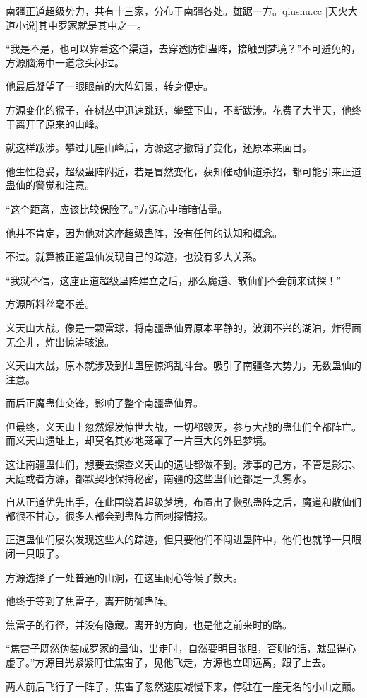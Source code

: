 \begin{this_body}
南疆正道超级势力，共有十三家，分布于南疆各处。雄踞一方。qiushu.cc [天火大道小说]其中罗家就是其中之一。

“我是不是，也可以靠着这个渠道，去穿透防御蛊阵，接触到梦境？”不可避免的，方源脑海中一道念头闪过。

他最后凝望了一眼眼前的大阵幻景，转身便走。

方源变化的猴子，在树丛中迅速跳跃，攀壁下山，不断跋涉。花费了大半天，他终于离开了原来的山峰。

就这样跋涉。攀过几座山峰后，方源这才撤销了变化，还原本来面目。

他生性稳妥，超级蛊阵附近，若是冒然变化，获知催动仙道杀招，都可能引来正道蛊仙的警觉和注意。

“这个距离，应该比较保险了。”方源心中暗暗估量。

他并不肯定，因为他对这座超级蛊阵，没有任何的认知和概念。

不过。就算被正道蛊仙发现自己的踪迹，也没有多大关系。

“我就不信，这座正道超级蛊阵建立之后，那么魔道、散仙们不会前来试探！”

方源所料丝毫不差。

义天山大战。像是一颗雷球，将南疆蛊仙界原本平静的，波澜不兴的湖泊，炸得面无全非，炸出惊涛骇浪。

义天山大战，原本就涉及到仙蛊屋惊鸿乱斗台。吸引了南疆各大势力，无数蛊仙的注意。

而后正魔蛊仙交锋，影响了整个南疆蛊仙界。

但最终，义天山上忽然爆发惊世大战，一切都毁灭，参与大战的蛊仙们全都阵亡。而义天山遗址上，却莫名其妙地笼罩了一片巨大的外显梦境。

这让南疆蛊仙们，想要去探查义天山的遗址都做不到。涉事的己方，不管是影宗、天庭或者方源，都默契地保持秘密，南疆的这些蛊仙还都是一头雾水。

自从正道优先出手，在此围绕着超级梦境，布置出了恢弘蛊阵之后，魔道和散仙们都很不甘心，很多人都会到蛊阵方面刺探情报。

正道蛊仙们屡次发现这些人的踪迹，但只要他们不闯进蛊阵中，他们也就睁一只眼闭一只眼了。

方源选择了一处普通的山洞，在这里耐心等候了数天。

他终于等到了焦雷子，离开防御蛊阵。

焦雷子的行径，并没有隐藏。离开的方向，也是他之前来时的路。

“焦雷子既然伪装成罗家的蛊仙，出走时，自然要明目张胆，否则的话，就显得心虚了。”方源目光紧紧盯住焦雷子，见他飞走，方源也立即远离，跟了上去。

两人前后飞行了一阵子，焦雷子忽然速度减慢下来，停驻在一座无名的小山之巅。


\end{this_body}
